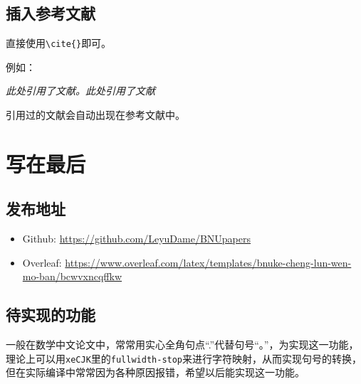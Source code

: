 \documentclass[12pt,hyperref,a4paper,UTF8]{ctexart}
\begin{document}
%
%
%
%
%
%

\subsection{插入参考文献}
直接使用\verb|\cite{}|即可。

例如：


   \textit{ 此处引用了文献\cite{0Isaac}。此处引用了文献\cite{2016The}}


引用过的文献会自动出现在参考文献中。

\section{写在最后}
\subsection{发布地址}
\begin{itemize}
    \item Github: \url{https://github.com/LeyuDame/BNUpapers}
    \item Overleaf:  \url{https://www.overleaf.com/latex/templates/bnuke-cheng-lun-wen-mo-ban/bcwvxncqffkw}
\end{itemize}
\subsection{待实现的功能}
一般在数学中文论文中，常常用实心全角句点“.”代替句号“。”，为实现这一功能，理论上可以用\verb|xeCJK|里的\verb|fullwidth-stop|来进行字符映射，从而实现句号的转换，但在实际编译中常常因为各种原因报错，希望以后能实现这一功能。

\end{document}
